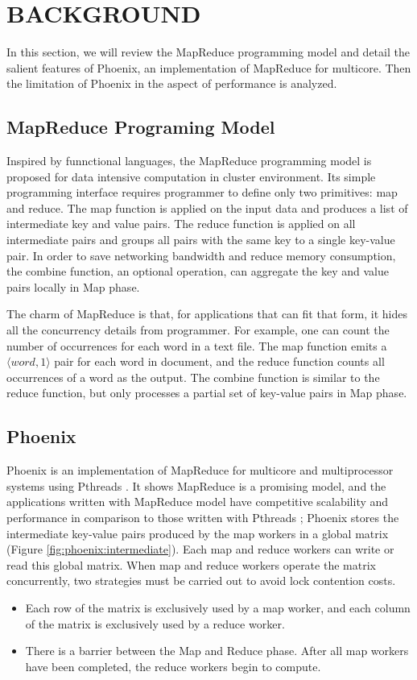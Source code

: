 \section{BACKGROUND}
In this section, we will review the MapReduce programming
model and detail the salient features of Phoenix, 
an implementation of MapReduce for multicore.
Then the limitation of Phoenix in the aspect of performance is analyzed.

\subsection{MapReduce Programing Model}
Inspired  by funnctional languages, the MapReduce programming model is 
proposed for data intensive computation in cluster environment.
Its simple programming interface requires programmer 
to  define only two primitives: map and reduce.
The map function is applied on the input data and 
produces a list of intermediate key and value pairs.
The reduce function is applied on all intermediate
pairs and  groups all pairs with the same key to a single
key-value pair. 
In order to save networking bandwidth and reduce memory consumption, 
the combine function, an optional operation, can aggregate the key and value pairs locally in Map phase.


The charm of MapReduce is that, 
for applications that can fit that form, 
it hides all the concurrency details from  programmer. 
For example, 
one can count the number of occurrences for each word in a text file. 
The map function emits a $\langle word, 1\rangle$ pair for each word in document, 
and the reduce function counts all occurrences of a word as the output. 
The combine function is similar to the reduce function, 
but only processes a partial set of key-value pairs in Map phase.


\subsection{Phoenix}
Phoenix is an implementation of MapReduce for multicore  and multiprocessor systems using Pthreads \cite{}.
It shows MapReduce is a promising model,  and the applications written with MapReduce model
have competitive scalability and performance in comparison to those
written with Pthreads \cite{ranger2007phoenix};
Phoenix stores the intermediate key-value pairs produced 
by the map workers in a global matrix (Figure \ref{fig:phoenix:intermediate}). 
Each map and reduce workers can write or read this global matrix. 
When map and reduce workers operate the matrix concurrently,
two strategies must be carried out to avoid lock contention costs.
\begin{itemize}
	\item Each row of the matrix is exclusively used by a map worker, 
	and each column of the matrix is exclusively used by a reduce worker. 
	\item There is a barrier between the Map and Reduce phase. 
	After all map workers have been completed, 
	the reduce workers begin to compute. 
\end{itemize}

